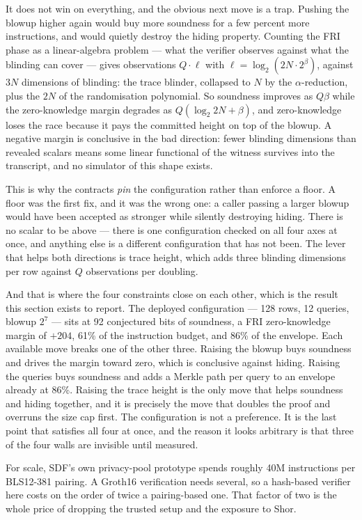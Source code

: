 \documentclass[11pt,a4paper]{article}
\begin{document}
It does not win on everything, and the obvious next move is a trap. Pushing the
blowup higher again would buy more soundness for a few percent more
instructions, and would quietly destroy the hiding property. Counting the FRI
phase as a linear-algebra problem --- what the verifier observes against what
the blinding can cover --- gives observations $Q \cdot \ell$ with
$\ell = \log_2(2N \cdot 2^\beta)$, against $3N$ dimensions of blinding: the
trace blinder, collapsed to $N$ by the $\alpha$-reduction, plus the $2N$ of the
randomisation polynomial. So soundness improves as $Q\beta$ while the
zero-knowledge margin degrades as $Q(\log_2 2N + \beta)$, and zero-knowledge
loses the race because it pays the committed height on top of the blowup. A
negative margin is conclusive in the bad direction: fewer blinding dimensions
than revealed scalars means some linear functional of the witness survives into
the transcript, and no simulator of this shape exists.

This is why the contracts \emph{pin} the configuration rather than enforce a
floor. A floor was the first fix, and it was the wrong one: a caller passing a
larger blowup would have been accepted as stronger while silently destroying
hiding. There is no scalar to be above --- there is one configuration checked on
all four axes at once, and anything else is a different configuration that has
not been. The lever that helps both directions is trace height, which adds three
blinding dimensions per row against $Q$ observations per doubling.

And that is where the four constraints close on each other, which is the
result this section exists to report. The deployed configuration --- 128 rows,
12 queries, blowup $2^7$ --- sits at 92 conjectured bits of soundness, a FRI
zero-knowledge margin of $+204$, 61\% of the instruction budget, and 86\% of the
envelope. Each available move breaks one of the other three. Raising the blowup
buys soundness and drives the margin toward zero, which is conclusive against
hiding. Raising the queries buys soundness and adds a Merkle path per query to
an envelope already at 86\%. Raising the trace height is the only move that
helps soundness and hiding together, and it is precisely the move that doubles
the proof and overruns the size cap first. The configuration is not a
preference. It is the last point that satisfies all four at once, and the reason
it looks arbitrary is that three of the four walls are invisible until measured.

For scale, SDF's own privacy-pool prototype spends roughly 40M instructions per
BLS12-381 pairing. A Groth16 verification needs several, so a hash-based
verifier here costs on the order of twice a pairing-based one. That factor of
two is the whole price of dropping the trusted setup and the exposure to Shor.
\end{document}
